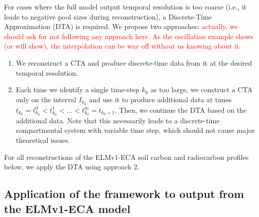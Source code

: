 \documentclass[11pt,a4paper]{article}
\newcommand{\red}[1]{\textcolor{red}{#1}}
\begin{document}
    For cases where the full model output temporal resolution is too coarse (i.e., it leads to negative pool sizes during reconstruction), a Discrete-Time Approximation (DTA) is required. We propose two approaches:
    \red{actually, we should ask for not following any approach here. As the oscillation example shows (or will show), the interpolation can be way off without us knowing about it.}
    
    
    \begin{enumerate}[(1)]
        \item We reconstruct a CTA and produce discrete-time data from it at the desired temporal resolution.
        \item Each time we identify a single time-step $k_0$ as too large, we construct a CTA only on the interval $I_{k_0}$ and use it to produce additional data at times $t_{k_0}=t_{k_0}^0<t_{k_0}^1<\ldots<t_{k_0}^m=t_{k_0+1}$.
        Then, we continue the DTA based on the additional data.
        Note that this necessarily leads to a discrete-time compartmental system with variable time step, which should not cause major theoretical issues.
    \end{enumerate}

For all reconstructions of the ELMv1-ECA soil carbon and radiocarbon profiles below, we apply the DTA using approach 2.

\subsection{Application of the framework to output from the ELMv1-ECA model}
    
\end{document}
